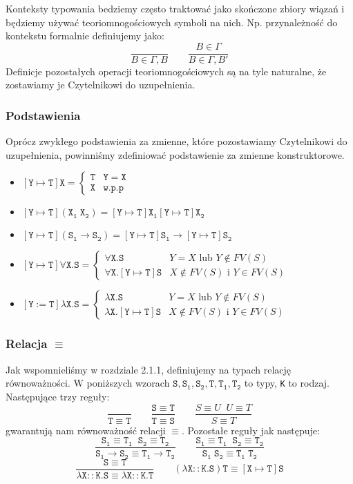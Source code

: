 \documentclass[11pt,leqno]{article}
\begin{document}
Konteksty typowania bedziemy często traktować jako skończone zbiory wiązań i będziemy
używać teoriomnogościowych symboli na nich. Np. przynależność do kontekstu formalnie
definiujemy jako:
\[
	\frac{}{B \in \Gamma,B}
	\qquad
	\frac{B \in \Gamma}{B \in \Gamma,B'}
\]
Definicje pozostałych operacji teoriomnogościowych są na tyle naturalne, że zostawiamy
je Czytelnikowi do uzupełnienia.


\subsubsection{Podstawienia}
Oprócz zwykłego podstawienia za zmienne, które pozostawiamy Czytelnikowi do uzupełnienia, powinniśmy zdefiniować podstawienie za zmienne konstruktorowe.

    \begin{itemize}
        \item $\mathtt{[Y \mapsto T]X = \begin{cases}  \texttt{T} & Y=X \\ \texttt{X} & \text{w.p.p} \end{cases}}$
        \item $\mathtt{[Y \mapsto T](X_1 \; X_2)  = [Y \mapsto T]X_1 [Y \mapsto T] X_2 }$
        \item $\mathtt{[Y \mapsto T](S_1 \rightarrow S_2) = [Y \mapsto T]S_1 \rightarrow [Y \mapsto T]S_2} $
        \item $\mathtt{[Y \mapsto T]\forall X.S}  = \begin{cases} \mathtt{\forall X.S} & Y=X \text{ lub } Y \notin FV(S) \\ \mathtt{\forall X.[Y \mapsto T]S} & X \notin FV(S)  \text{ i } Y \in FV(S) \end{cases}$
        \item $\mathtt{[Y := T]\lambda X.S }= \begin{cases} \mathtt{\lambda X.S} & Y=X \text{ lub } Y \notin FV(S)\\ \mathtt{\lambda X.[Y \mapsto T]S}  & X \notin FV(S)  \text{ i } Y \in FV(S) \end{cases}$
    \end{itemize}

\subsubsection{Relacja $\equiv$}

Jak wspomnieliśmy w rozdziale 2.1.1, definiujemy na typach relację równoważności. W poniższych wzorach $\mathtt{S,S_1,S_2,T,T_1,T_2}$ to typy, \texttt{K} to rodzaj. Następujące trzy reguły:
	\[\mathtt{
		\frac{}{T \equiv T}
                \qquad
                \frac{S \equiv T}{T \equiv S}}
                \qquad
                \frac{S \equiv U \;\; U \equiv T}{S \equiv T}
	\]
gwarantują nam równoważność relacji $\equiv$. Pozostałe reguły jak następuje:
	\[\mathtt{
		\frac{S_1 \equiv T_1 \;\; S_2 \equiv T_2}{S_1 \rightarrow S_2 \equiv T_1 \rightarrow T_2}
                \qquad
                \frac{S_1 \equiv T_1 \;\; S_2 \equiv T_2}{S_1\;S_2 \equiv T_1\;T_2}}
	\]
	\[\mathtt{
		\frac{S \equiv T}{\lambda X::K.S \equiv \lambda X::K.T}
                \qquad
                (\lambda X::K.S)T \equiv [X \mapsto T]S}
	\] 
\end{document}
